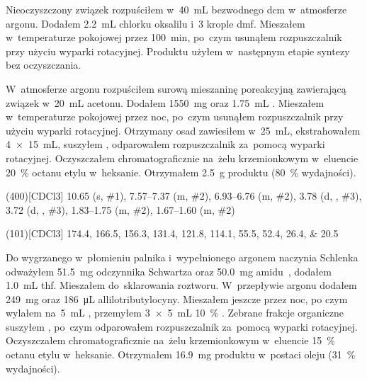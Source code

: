 Nieoczyszczony związek  rozpuściłem w~\SI{40}{\mL}
  bezwodnego \gls{dcm} w~atmosferze argonu. Dodałem \SI{2.2}{\mL} chlorku oksalilu
  i~\num{3} krople \gls{dmf}.
Mieszałem w~temperaturze pokojowej przez \SI{100}{\minute}, po~czym usunąłem rozpuszczalnik
  przy użyciu wyparki rotacyjnej.
Produktu użyłem w~następnym etapie syntezy bez oczyszczania.

W~atmosferze argonu rozpuściłem surową mieszaninę poreakcyjną zawierającą związek
   w~\SI{20}{\mL} acetonu.
Dodałem \SI{1550}{\milli\gram}  oraz \SI{1.75}{\mL} .
Mieszałem w~temperaturze pokojowej przez noc, po~czym usunąłem rozpuszczalnik przy użyciu
  wyparki rotacyjnej.
Otrzymany osad zawiesiłem w~\SI{25}{\mL},
  ekstrahowałem \SI[product-units = single]{4 x 15}{\mL},
  suszyłem , odparowałem rozpuszczalnik za~pomocą wyparki rotacyjnej.
Oczyszczałem chromatograficznie na~żelu krzemionkowym w~eluencie \SI{20}{\percent} octanu
  etylu w~heksanie.
Otrzymałem \SI{2.5}{\gram} produktu (\SI{80}{\percent} wydajności).

\begin{fullexp}
  \NMR(400)[CDCl3] \num{10.65} (s, \#{1}), \numrange{7.57}{7.37} (m, \#{2}), \numrange{6.93}{6.76} (m, \#{2}), \num{3.78} (d, , \#{3}), \num{3.72} (d, , \#{3}), \numrange{1.83}{1.75} (m, \#{2}), \numrange{1.67}{1.60} (m, \#{2})\par\noindent
  (101)[CDCl3] \numlist{174.4; 166.5; 156.3; 131.4; 121.8; 114.1; 55.5; 52.4; 26.4; 20.5}
\end{fullexp}

Do wygrzanego w~płomieniu palnika i~wypełnionego argonem naczynia Schlenka odważyłem
  \SI{51.5}{\mg} odczynnika Schwartza oraz \SI{50.0}{\mg} amidu~,
  dodałem \SI{1.0}{\mL} \gls{thf}.
Mieszałem do~sklarowania roztworu.
W~przepływie argonu dodałem  \SI{249}{\mg}  oraz  \SI{186}{\uL} allilotributylocyny.
Mieszałem jeszcze przez noc, po czym wylałem na~\SI{5}{\mL} ,
  przemyłem \SI[product-units = single]{3 x 5}{\mL} \SI{10}{\percent} .
Zebrane frakcje organiczne suszyłem , po~czym odparowałem rozpuszczalnik za~pomocą
  wyparki rotacyjnej.
Oczyszczałem chromatograficznie na~żelu krzemionkowym w~eluencie \SI{15}{\percent} octanu
  etylu w~heksanie.
Otrzymałem \SI{16.9}{\mg} produktu w~postaci oleju (\SI{31}{\percent} wydajności).

